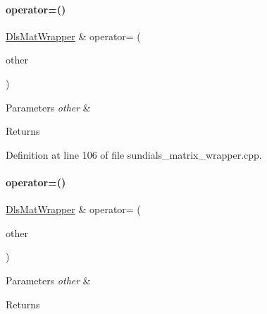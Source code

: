\paragraph{\texorpdfstring{operator=()}{operator=()}\hspace{0.1cm}{\footnotesize\ttfamily [1/2]}}
{\footnotesize\ttfamily \mbox{\hyperlink{classamici_1_1_dls_mat_wrapper}{Dls\+Mat\+Wrapper}} \& operator= (\begin{DoxyParamCaption}\item[{const \mbox{\hyperlink{classamici_1_1_dls_mat_wrapper}{Dls\+Mat\+Wrapper}} \&}]{other }\end{DoxyParamCaption})}


\begin{DoxyParams}{Parameters}
{\em other} & \\
\hline
\end{DoxyParams}
\begin{DoxyReturn}{Returns}

\end{DoxyReturn}


Definition at line 106 of file sundials\+\_\+matrix\+\_\+wrapper.\+cpp.

\mbox{\label{classamici_1_1_dls_mat_wrapper_acb214b2f2dac5b32edfed3083d2c3e06}} 
\paragraph{\texorpdfstring{operator=()}{operator=()}\hspace{0.1cm}{\footnotesize\ttfamily [2/2]}}
{\footnotesize\ttfamily \mbox{\hyperlink{classamici_1_1_dls_mat_wrapper}{Dls\+Mat\+Wrapper}} \& operator= (\begin{DoxyParamCaption}\item[{\mbox{\hyperlink{classamici_1_1_dls_mat_wrapper}{Dls\+Mat\+Wrapper}} \&\&}]{other }\end{DoxyParamCaption})\hspace{0.3cm}{\ttfamily [noexcept]}}


\begin{DoxyParams}{Parameters}
{\em other} & \\
\hline
\end{DoxyParams}
\begin{DoxyReturn}{Returns}

\end{DoxyReturn}



